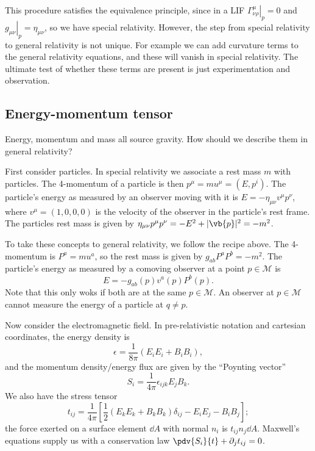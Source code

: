 \documentclass{jknotes}
\begin{document}
This procedure satisfies the equivalence principle, since in a LIF \(\left.\Gamma^\mu_{\nu\rho}\right|_p = 0\) and \(\left.g_{\mu\nu}\right|_p = \eta_{\mu\nu}\), so we have special relativity. However, the step from special relativity to general relativity is not unique. For example we can add curvature terms to the general relativity equations, and these will vanish in special relativity. The ultimate test of whether these terms are present is just experimentation and observation.

\subsection{Energy-momentum tensor}
Energy, momentum and mass all source gravity. How should we describe them in general relativity?

First consider particles. In special relativity we associate a rest mass \(m\) with particles. The 4-momentum of a particle is then \(p^\mu= mu^\mu = (E,p^i)\). The particle's energy as measured by an observer moving with it is \(E = -\eta_{\mu\nu}v^\mu p^\nu\), where \(v^\mu = (1,0,0,0)\) is the velocity of the observer in the particle's rest frame. The particles rest mass is given by \(\eta_{\mu\nu}p^\mu p^\nu = -E^2 + |\vb{p}|^2 = -m^2\).

To take these concepts to general relativity, we follow the recipe above. The 4-momentum is \(P^a=m u^a\), so the rest mass is given by \(g_{ab}P^aP^b=-m^2\). The particle's energy as measured by a comoving observer at a point \(p\in\mathcal{M}\) is
\begin{equation}
    E = -g_{ab}(p) v^a(p) P^b(p).
\end{equation}
Note that this only woks if both are at the same \(p \in \mathcal{M}\). An observer at \(p\in\mathcal{M}\) cannot measure the energy of a particle at \(q\ne p\).

Now consider the electromagnetic field. In pre-relativistic notation and cartesian coordinates, the energy density is
\begin{equation}
    \epsilon = \frac1{8\pi}(E_iE_i + B_iB_i),
\end{equation}
and the momentum density/energy flux are given by the ``Poynting vector''
\begin{equation}
    S_i = \frac1{4\pi}\epsilon_{ijk}E_jB_k.
\end{equation}
We also have the stress tensor
\begin{equation}
    t_{ij} = \frac1{4\pi}\left[\frac12(E_kE_k+B_kB_k)\delta_{ij} - E_iE_j-B_iB_j\right];
\end{equation}
the force exerted on a surface element \(\dd{A}\) with normal \(n_i\) is \(t_{ij}n_j\dd{A}\). Maxwell's equations supply us with a conservation law \(\pdv{S_i}{t} + \partial_j t_{ij} = 0\). 
\end{document}
